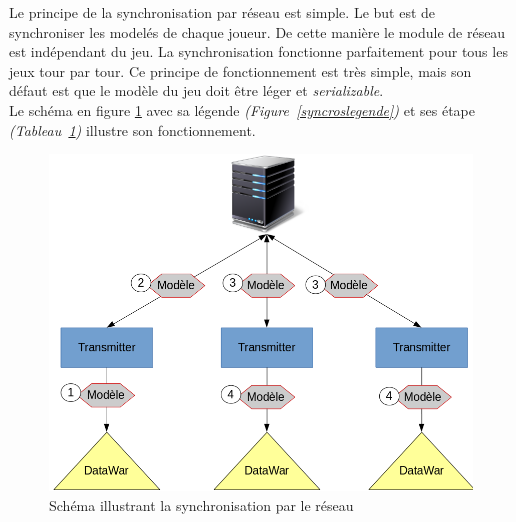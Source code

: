 \documentclass[a4paper,11pt]{report}
\begin{document}
  Le principe de la synchronisation par réseau est simple. Le but est de synchroniser les modelés de chaque joueur. De cette manière le module de réseau est indépendant du jeu. La synchronisation fonctionne parfaitement pour tous les jeux tour par tour. Ce principe de fonctionnement est très simple, mais son défaut est que le modèle du jeu doit être léger et \textit{serializable}.
\\
Le schéma en figure \ref{syncros} avec sa légende \textit{(Figure~\ref{syncroslegende})} et ses étape \textit{(Tableau~\ref{syncros})} illustre son fonctionnement.
  \begin{figure}[th]
      \begin{center}
        \includegraphics[scale=0.4]{Assets/s_r_2.png}
        \caption{Schéma illustrant la synchronisation par le réseau}
        \label{syncros}
      \end{center}
  \end{figure}
  
\end{document}
